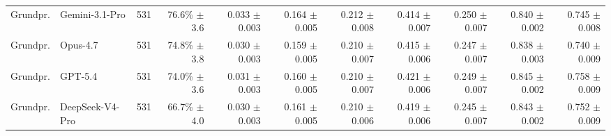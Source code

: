\begin{table}[t]
{\begin{tabular}{llrrrrrrrrr}
Grundpr. & Gemini-3.1-Pro & 531 & \shortstack[r]{76.6\%\\{\scriptsize $\pm$3.6}} & \shortstack[r]{0.033\\{\scriptsize $\pm$0.003}} & \shortstack[r]{0.164\\{\scriptsize $\pm$0.005}} & \shortstack[r]{0.212\\{\scriptsize $\pm$0.008}} & \shortstack[r]{0.414\\{\scriptsize $\pm$0.007}} & \shortstack[r]{0.250\\{\scriptsize $\pm$0.007}} & \shortstack[r]{0.840\\{\scriptsize $\pm$0.002}} & \shortstack[r]{0.745\\{\scriptsize $\pm$0.008}} \\
Grundpr. & Opus-4.7 & 531 & \shortstack[r]{74.8\%\\{\scriptsize $\pm$3.8}} & \shortstack[r]{0.030\\{\scriptsize $\pm$0.003}} & \shortstack[r]{0.159\\{\scriptsize $\pm$0.005}} & \shortstack[r]{0.210\\{\scriptsize $\pm$0.007}} & \shortstack[r]{0.415\\{\scriptsize $\pm$0.006}} & \shortstack[r]{0.247\\{\scriptsize $\pm$0.007}} & \shortstack[r]{0.838\\{\scriptsize $\pm$0.003}} & \shortstack[r]{0.740\\{\scriptsize $\pm$0.009}} \\
Grundpr. & GPT-5.4 & 531 & \shortstack[r]{74.0\%\\{\scriptsize $\pm$3.6}} & \shortstack[r]{0.031\\{\scriptsize $\pm$0.003}} & \shortstack[r]{0.160\\{\scriptsize $\pm$0.005}} & \shortstack[r]{0.210\\{\scriptsize $\pm$0.007}} & \shortstack[r]{0.421\\{\scriptsize $\pm$0.006}} & \shortstack[r]{0.249\\{\scriptsize $\pm$0.007}} & \shortstack[r]{0.845\\{\scriptsize $\pm$0.002}} & \shortstack[r]{0.758\\{\scriptsize $\pm$0.009}} \\
Grundpr. & DeepSeek-V4-Pro & 531 & \shortstack[r]{66.7\%\\{\scriptsize $\pm$4.0}} & \shortstack[r]{0.030\\{\scriptsize $\pm$0.003}} & \shortstack[r]{0.161\\{\scriptsize $\pm$0.005}} & \shortstack[r]{0.210\\{\scriptsize $\pm$0.006}} & \shortstack[r]{0.419\\{\scriptsize $\pm$0.006}} & \shortstack[r]{0.245\\{\scriptsize $\pm$0.007}} & \shortstack[r]{0.843\\{\scriptsize $\pm$0.002}} & \shortstack[r]{0.752\\{\scriptsize $\pm$0.009}} \\

\end{tabular}}
\end{table}
